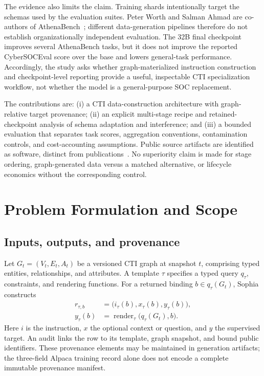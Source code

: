 \documentclass[journal]{IEEEtran}
\begin{document}
The evidence also limits the claim. Training shards intentionally target the schemas used by the evaluation suites. Peter Worth and Salman Ahmad are co-authors of AthenaBench~\cite{alam2025athenabench}; different data-generation pipelines therefore do not establish organizationally independent evaluation. The 32B final checkpoint improves several AthenaBench tasks, but it does not improve the reported CyberSOCEval score over the base and lowers general-task performance. Accordingly, the study asks whether graph-materialized instruction construction and checkpoint-level reporting provide a useful, inspectable CTI specialization workflow, not whether the model is a general-purpose SOC replacement.

The contributions are: (i) a CTI data-construction architecture with graph-relative target provenance; (ii) an explicit multi-stage recipe and retained-checkpoint analysis of schema adaptation and interference; and (iii) a bounded evaluation that separates task scores, aggregation conventions, contamination controls, and cost-accounting assumptions. Public source artifacts are identified as software, distinct from publications~\cite{glaukopis2026software}. No superiority claim is made for stage ordering, graph-generated data versus a matched alternative, or lifecycle economics without the corresponding control.

\section{Problem Formulation and Scope}\label{sec:problem}
\subsection{Inputs, outputs, and provenance}
Let $G_t=(V_t,E_t,A_t)$ be a versioned CTI graph at snapshot $t$, comprising typed entities, relationships, and attributes. A template $\tau$ specifies a typed query $q_\tau$, constraints, and rendering functions. For a returned binding $b\in q_\tau(G_t)$, Sophia constructs
\begin{align}
 r_{\tau,b}&=\bigl(i_\tau(b),x_\tau(b),y_\tau(b)\bigr),\\
 y_\tau(b)&=\operatorname{render}_{\tau}\bigl(q_\tau(G_t),b\bigr).
\end{align}
Here $i$ is the instruction, $x$ the optional context or question, and $y$ the supervised target. An audit links the row to its template, graph snapshot, and bound public identifiers. These provenance elements may be maintained in generation artifacts; the three-field Alpaca training record alone does not encode a complete immutable provenance manifest.
\end{document}
